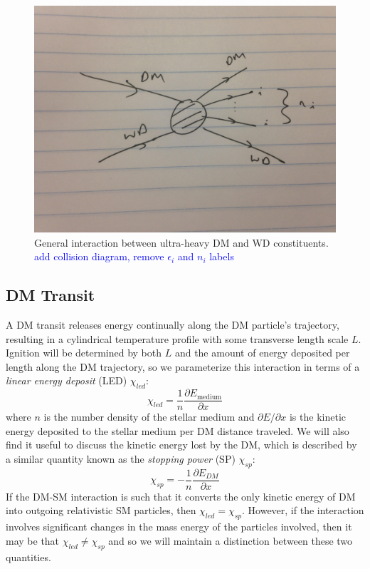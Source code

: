 \documentclass[twocolumn,showpacs,preprintnumbers,amsmath,amssymb,prd]{revtex4}
\begin{document}
\begin{figure}
\includegraphics[scale=.05]{feynmandiag}
\caption{General interaction between ultra-heavy DM and WD constituents. \textcolor{blue}{add collision diagram, remove $\epsilon_i$ and $n_i$ labels}}
\end{figure}

\subsection{DM Transit}

A DM transit releases energy continually along the DM particle's trajectory, resulting in a cylindrical temperature profile with some transverse length scale $L$.  Ignition will be determined by both $L$ and the amount of energy deposited per length along the DM trajectory, so we parameterize this interaction in terms of a \emph{linear energy deposit} (LED) $\chi_{led}$:
\[
    \chi_{led} = 
    \frac{1}{n} \frac{\partial{E_{\text{medium}}}}{\partial{x}}
\]
where $n$ is the number density of the stellar medium and $\partial{E}/\partial{x}$ is the kinetic energy deposited to the stellar medium per DM distance traveled.  We will also find it useful to discuss the kinetic energy lost by the DM, which is described by a similar quantity known as the \emph{stopping power} (SP) $\chi_{sp}$:
\[
    \chi_{sp} = 
    - \frac{1}{n} \frac{\partial{E_{DM}}}{\partial{x}}
\]
If the DM-SM interaction is such that it converts the only kinetic energy of DM into outgoing relativistic SM particles, then $\chi_{led} = \chi_{sp}$.  However, if the interaction involves significant changes in the mass energy of the particles involved, then it may be that $\chi_{led} \neq \chi_{sp}$ and so we will maintain a distinction between these two quantities. 
\end{document}
